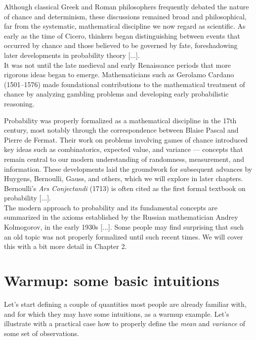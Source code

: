 \documentclass{book}
\begin{document}
Although classical Greek and Roman philosophers frequently debated the nature of chance and determinism, these discussions remained broad and philosophical, far from the systematic, mathematical discipline we now regard as scientific. As early as the time of Cicero, thinkers began distinguishing between events that occurred by chance and those believed to be governed by fate, foreshadowing later developments in probability theory [...].\\

It was not until the late medieval and early Renaissance periods that more rigorous ideas began to emerge. Mathematicians such as Gerolamo Cardano (1501–1576) made foundational contributions to the mathematical treatment of chance by analyzing gambling problems and developing early probabilistic reasoning.

Probability was properly formalized as a mathematical discipline in the 17th century, most notably through the correspondence between Blaise Pascal and Pierre de Fermat. Their work on problems involving games of chance introduced key ideas such as combinatorics, expected value, and variance — concepts that remain central to our modern understanding of randomness, measurement, and information. These developments laid the groundwork for subsequent advances by Huygens, Bernoulli, Gauss, and others, which we will explore in later chapters. Bernoulli’s \textit{Ars Conjectandi} (1713) is often cited as the first formal textbook on probability [...]. \\

\indent The modern approach to probability and its fundamental concepts are summarized in the axioms established by the Russian mathematician Andrey Kolmogorov, in the early 1930s [...]. Some people may find surprising that such an old topic was not properly formalized until such recent times. We will cover this with a bit more detail in Chapter 2.\\

\newpage

\section{Warmup: some basic intuitions}

Let's start defining a couple of quantities most people are already familiar with, and for which they may have some intuitions, as a warmup example. Let's illustrate with a practical case how to properly define the \textit{mean} and \textit{variance} of some set of observations.\\
	
\end{document}
